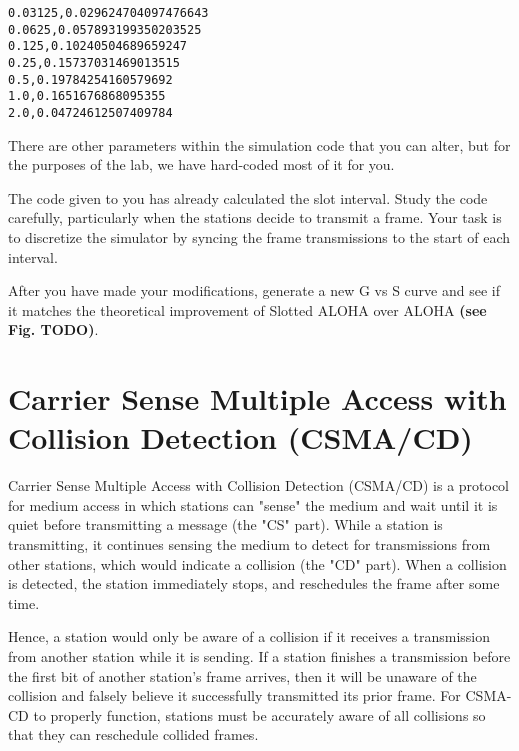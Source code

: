 \documentclass[11pt]{article}
\begin{document}
\begin{lstlisting}[style=ece361shell, caption={Sample data from \texttt{out.txt} for ALOHA}, label={lst:aloha-output}]
0.03125,0.029624704097476643
0.0625,0.057893199350203525
0.125,0.10240504689659247
0.25,0.15737031469013515
0.5,0.19784254160579692
1.0,0.1651676868095355
2.0,0.04724612507409784
\end{lstlisting}

There are other parameters within the simulation code that you can alter, but for the purposes of the lab, we have hard-coded most of it for you.

The code given to you has already calculated the slot interval.
Study the code carefully, particularly when the stations decide to transmit a frame.
Your task is to discretize the simulator by syncing the frame transmissions to the start of each interval.

After you have made your modifications, generate a new G vs S curve and see if it matches the theoretical improvement of Slotted ALOHA over ALOHA \textbf{(see Fig. TODO)}.



\section{Carrier Sense Multiple Access with Collision Detection (CSMA/CD)}
\label{sec:csma-cd}
Carrier Sense Multiple Access with Collision Detection (CSMA/CD) is a protocol for medium access in which stations can "sense" the medium and wait until it is quiet before transmitting a message (the "CS" part).
While a station is transmitting, it continues sensing the medium to detect for transmissions from other stations, which would indicate a collision (the "CD" part).
When a collision is detected, the station immediately stops, and reschedules the frame after some time.

Hence, a station would only be aware of a collision if it receives a transmission from another station while it is sending.
If a station finishes a transmission before the first bit of another station's frame arrives, then it will be unaware of the collision and falsely believe it successfully transmitted its prior frame.
For CSMA-CD to properly function, stations must be accurately aware of all collisions so that they can reschedule collided frames.
\end{document}
